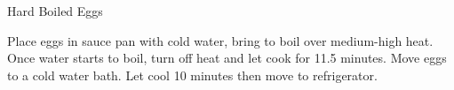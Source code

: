 
\begin{recipe}{Hard Boiled Eggs}%
  \maketitle

  Place eggs in sauce pan with cold water, bring to boil over medium-high heat. Once
  water starts to boil, turn off heat and let cook for 11.5 minutes. Move eggs to a
  cold water bath. Let cool 10 minutes then move to refrigerator.
\end{recipe}

